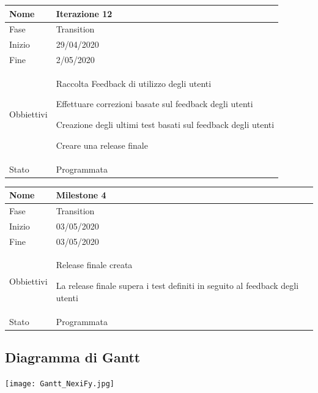 \begin{center}
\begin{tabular}{ |p{2cm}|p{10cm}|  }
\hline
Nome & Iterazione 12 \\\hline
Fase & Transition \\\hline
Inizio & 29/04/2020 \\\hline
Fine &  2/05/2020  \\\hline
Obbiettivi & 
	\begin{compactitem}
		\item Raccolta Feedback di utilizzo degli utenti
		\item Effettuare correzioni basate sul feedback degli utenti
		\item Creazione degli ultimi test basati sul feedback degli utenti
		\item Creare una release finale
	\end{compactitem}\\\hline
Stato &  Programmata \\\hline
\end{tabular}
\label{table:12}\newline

\begin{tabular}{ |p{2cm}|p{10cm}|  }
\hline
Nome & Milestone 4\\\hline
Fase & Transition \\\hline
Inizio & 03/05/2020 \\\hline
Fine &  03/05/2020 \\\hline
Obbiettivi & 
	\begin{compactitem}
		\item Release finale creata
		\item La release finale supera i test definiti in seguito al feedback degli utenti
	\end{compactitem}\\\hline
Stato &  Programmata \\\hline
\end{tabular}
\label{table:milestone4}\newline


\end{center}

\subsection{Diagramma di Gantt}
\vspace{0.5cm}
\begin{center}
	\hspace*{-2cm}\texttt{[image: Gantt\_NexiFy.jpg]}
\end{center}
\vspace{2cm}


